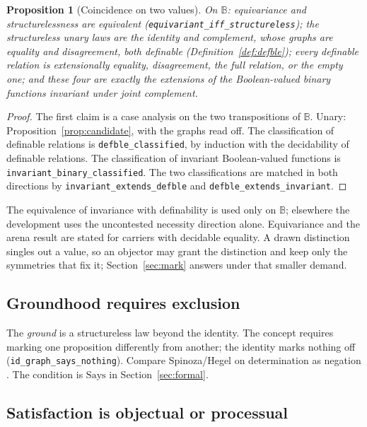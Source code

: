 \documentclass[11pt]{article}
\newtheorem{proposition}[theorem]{Proposition}
\newcommand{\Says}{\mathrm{Says}}
\newcommand{\lf}[1]{\texttt{#1}}
\newcommand{\B}{\mathbb{B}}
\begin{document}
\begin{proposition}[Coincidence on two values]
\label{prop:coincide}
On $\B$: equivariance and structurelessness are equivalent (\lf{equivariant\_iff\_structureless}); the structureless unary laws are the identity and complement, whose graphs are equality and disagreement, both definable (Definition~\ref{def:defble}); every definable relation is extensionally equality, disagreement, the full relation, or the empty one; and these four are exactly the extensions of the Boolean-valued binary functions invariant under joint complement.
\end{proposition}

\begin{proof}
The first claim is a case analysis on the two transpositions of $\B$. Unary: Proposition~\ref{prop:candidate}, with the graphs read off. The classification of definable relations is \lf{defble\_classified}, by induction with the decidability of definable relations. The classification of invariant Boolean-valued functions is \lf{invariant\_binary\_classified}. The two classifications are matched in both directions by \lf{invariant\_extends\_defble} and \lf{defble\_extends\_invariant}.
\end{proof}

The equivalence of invariance with definability is used only on $\B$; elsewhere the development uses the uncontested necessity direction alone. Equivariance and the arena result are stated for carriers with decidable equality. A drawn distinction singles out a value, so an objector may grant the distinction and keep only the symmetries that fix it; Section~\ref{sec:mark} answers under that smaller demand.

\subsection{Groundhood requires exclusion}

The \emph{ground} is a structureless law beyond the identity. The concept requires marking one proposition differently from another; the identity marks nothing off (\lf{id\_graph\_says\_nothing}). Compare Spinoza/Hegel on determination as negation \cite{spinoza1674,hegel1832}. The condition is $\Says$ in Section~\ref{sec:formal}.

\subsection{Satisfaction is objectual or processual}
\end{document}
